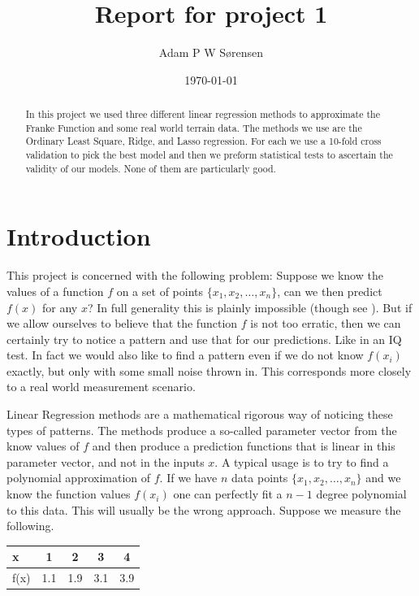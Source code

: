\documentclass[parskip=half]{scrartcl}
\title{Report for project 1}
\date{\today}
\author{Adam P W S{\o}rensen}
\theoremstyle{definition}
\theoremstyle{remark}
\begin{document}

\maketitle

\begin{abstract}
In this project we used three different linear regression methods to approximate the Franke Function and some real world terrain data. 
The methods we use are the Ordinary Least Square, Ridge, and Lasso regression. 
For each we use a 10-fold cross validation to pick the best model and then we preform statistical tests to ascertain the validity of our models. 
None of them are particularly good. 
\end{abstract}


\section{Introduction}

This project is concerned with the following problem: Suppose we know the values of a function $f$ on a set of points $\{x_1, x_2, \ldots, x_n\}$, can we then predict $f(x)$ for any $x$?
In full generality this is plainly impossible (though see \cite{ht:choice}).
But if we allow ourselves to believe that the function $f$ is not too erratic, then we can certainly try to notice a pattern and use that for our predictions.
Like in an IQ test.
In fact we would also like to find a pattern even if we do not know $f(x_i)$ exactly, but only with some small noise thrown in.
This corresponds more closely to a real world measurement scenario. 

Linear Regression methods are a mathematical rigorous way of noticing these types of patterns.
The methods produce a so-called parameter vector from the know values of $f$ and then produce a prediction functions that is linear in this parameter vector, and not in the inputs $x$. 
A typical usage is to try to find a polynomial approximation of $f$. 
If we have $n$ data points $\{x_1, x_2, \ldots, x_n\}$ and we know the function values $f(x_i)$ one can perfectly fit a $n-1$ degree polynomial to this data.
This will usually be the wrong approach. 
Suppose we measure the following. 

\begin{center}
\begin{tabular}{l|cccc}
x & 1 & 2 & 3 & 4\\
\hline
f(x) & 1.1 & 1.9 & 3.1 & 3.9
\end{tabular} 
\end{center} 
\end{document}
